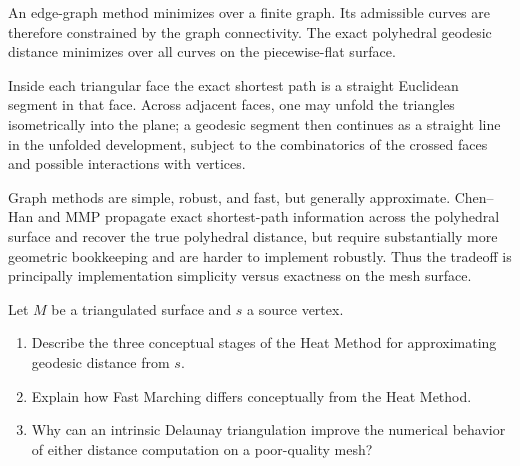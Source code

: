 \begin{solution}
An edge-graph method minimizes over a finite graph.  Its admissible curves are
therefore constrained by the graph connectivity.  The exact polyhedral
geodesic distance minimizes over all curves on the piecewise-flat surface.

Inside each triangular face the exact shortest path is a straight Euclidean
segment in that face.  Across adjacent faces, one may unfold the triangles
isometrically into the plane; a geodesic segment then continues as a straight
line in the unfolded development, subject to the combinatorics of the crossed
faces and possible interactions with vertices.

Graph methods are simple, robust, and fast, but generally approximate.
Chen--Han and MMP propagate exact shortest-path information across the
polyhedral surface and recover the true polyhedral distance, but require
substantially more geometric bookkeeping and are harder to implement robustly.
Thus the tradeoff is principally implementation simplicity versus exactness on
the mesh surface.
\end{solution}


\begin{problem}
\label{prob:vii-gap-40}
Let \(M\) be a triangulated surface and \(s\) a source vertex.

\begin{enumerate}
\item Describe the three conceptual stages of the Heat Method for approximating
geodesic distance from \(s\).
\item Explain how Fast Marching differs conceptually from the Heat Method.
\item Why can an intrinsic Delaunay triangulation improve the numerical
behavior of either distance computation on a poor-quality mesh?
\end{enumerate}
\end{problem}

